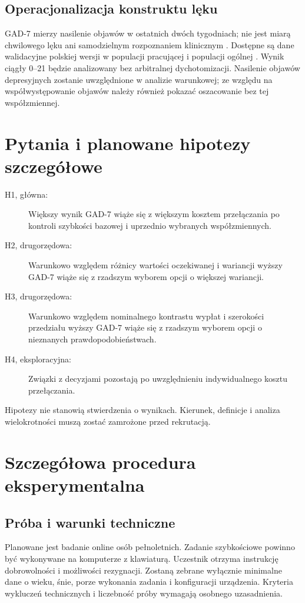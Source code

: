 \documentclass[11pt,a4paper]{article}
\begin{document}
\subsection{Operacjonalizacja konstruktu lęku}
GAD-7 mierzy nasilenie objawów w ostatnich dwóch tygodniach; nie jest miarą chwilowego lęku ani samodzielnym rozpoznaniem klinicznym \cite{Spitzer2006}. Dostępne są dane walidacyjne polskiej wersji w populacji pracującej i populacji ogólnej \cite{GADPL2023,GADPL2025}. Wynik ciągły 0--21 będzie analizowany bez arbitralnej dychotomizacji. Nasilenie objawów depresyjnych zostanie uwzględnione w analizie warunkowej; ze względu na współwystępowanie objawów należy również pokazać oszacowanie bez tej współzmiennej.

\section{Pytania i planowane hipotezy szczegółowe}
\begin{description}
\item[H1, główna:] Większy wynik GAD-7 wiąże się z większym kosztem przełączania po kontroli szybkości bazowej i uprzednio wybranych współzmiennych.
\item[H2, drugorzędowa:] Warunkowo względem różnicy wartości oczekiwanej i wariancji wyższy GAD-7 wiąże się z rzadszym wyborem opcji o większej wariancji.
\item[H3, drugorzędowa:] Warunkowo względem nominalnego kontrastu wypłat i szerokości przedziału wyższy GAD-7 wiąże się z rzadszym wyborem opcji o nieznanych prawdopodobieństwach.
\item[H4, eksploracyjna:] Związki z decyzjami pozostają po uwzględnieniu indywidualnego kosztu przełączania.
\end{description}
Hipotezy nie stanowią stwierdzenia o wynikach. Kierunek, definicje i analiza wielokrotności muszą zostać zamrożone przed rekrutacją.

\section{Szczegółowa procedura eksperymentalna}
\subsection{Próba i warunki techniczne}
Planowane jest badanie online osób pełnoletnich. Zadanie szybkościowe powinno być wykonywane na komputerze z klawiaturą. Uczestnik otrzyma instrukcję dobrowolności i możliwości rezygnacji. Zostaną zebrane wyłącznie minimalne dane o wieku, śnie, porze wykonania zadania i konfiguracji urządzenia. Kryteria wykluczeń technicznych i liczebność próby wymagają osobnego uzasadnienia.
\end{document}
